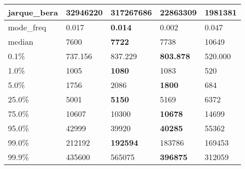 \begin{table}[H]
\begin{tabular}{|l|m{10em}|m{10em}|m{10em}|m{10em}|}
\hline jarque\_bera & 32946220 & \cellcolor[rgb]{0.9, 0.54, 0.52} 317267686 & \bfseries 22863309 & 1981381 \\
\hline mode\_freq & 0.017 & \bfseries 0.014 & 0.002 & \cellcolor[rgb]{0.9, 0.54, 0.52} 0.047 \\
\hline median & 7600 & \bfseries 7722 & 7738 & \cellcolor[rgb]{0.9, 0.54, 0.52} 10649 \\
\hline 0.1\% & 737.156 & 837.229 & \bfseries 803.878 & \cellcolor[rgb]{0.9, 0.54, 0.52} 520.000 \\
\hline 1.0\% & 1005 & \bfseries 1080 & 1083 & \cellcolor[rgb]{0.9, 0.54, 0.52} 520 \\
\hline 5.0\% & 1756 & 2086 & \bfseries 1800 & \cellcolor[rgb]{0.9, 0.54, 0.52} 684 \\
\hline 25.0\% & 5001 & \bfseries 5150 & 5169 & \cellcolor[rgb]{0.9, 0.54, 0.52} 6372 \\
\hline 75.0\% & 10607 & 10300 & \bfseries 10678 & \cellcolor[rgb]{0.9, 0.54, 0.52} 14699 \\
\hline 95.0\% & 42999 & 39920 & \bfseries 40285 & \cellcolor[rgb]{0.9, 0.54, 0.52} 55362 \\
\hline 99.0\% & 212192 & \bfseries 192594 & 183786 & \cellcolor[rgb]{0.9, 0.54, 0.52} 169453 \\
\hline 99.9\% & 435600 & \cellcolor[rgb]{0.9, 0.54, 0.52} 565075 & \bfseries 396875 & 312059 \\
\hline
\end{tabular}
\end{table}
